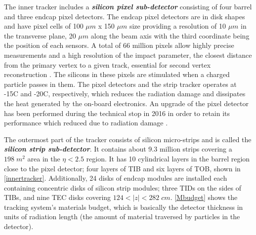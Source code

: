 The inner tracker includes a \textbf{\emph{silicon pixel sub-detector}} consisting of four barrel and three endcap pixel detectors. The endcap pixel detectors are in disk shapes and have pixel cells of 100 $\mu m$ x 150 $\mu m$ size providing a resolution of 10 $\mu m$ in the transverse plane, 20 $\mu m$ along the beam axis with the third coordinate being the position of each sensors. A total of 66 million pixels \cite{innertracker} allow highly precise measurements and a high resolution of the impact parameter, the closest distance from the primary vertex to a given track, essential for second vertex reconstruction \cite{innertracker2}. The silicons in these pixels are stimulated when a charged particle passes in them. The pixel detectors and the strip tracker operates at -15\textdegree C and -20\textdegree C, respectively, which reduces the radiation damage and dissipates the heat generated by the on-board electronics. An upgrade of the pixel detector has been performed during the technical stop in 2016 in order to retain its performance which reduced due to radiation damage \cite{tracker3}.

The outermost part of the tracker consists of silicon micro-strips and is called the \textbf{\emph{silicon strip sub-detector}}. It contains about 9.3 million strips covering a $198\;m^2$ area in the $\eta < 2.5$ region. It has 10 cylindrical layers in the barrel region close to the pixel detector; four layers of TIB and six layers of TOB, shown in \autoref{innertracker}. Additionally, 24 disks of endcap modules are installed each containing concentric disks of silicon strip modules; three TIDs on the sides of TIBs, and nine TEC disks covering $124<|z|<282\;cm$. \autoref{Mbudget} shows the tracking system's materials budget, which is basically the detector thickness in units of radiation length (the amount of material traversed by particles in the detector).

